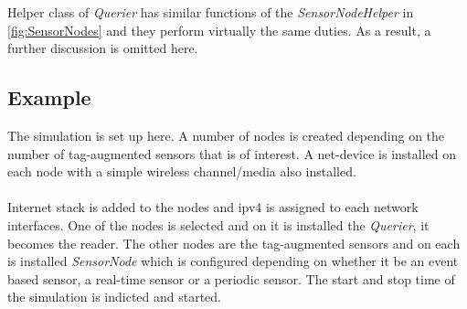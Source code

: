 Helper class of \textit{Querier} has similar functions of the \textit{SensorNodeHelper}
in \ref{fig:SensorNodes} and they perform virtually the same duties. As a result,
a further discussion is omitted here.

\subsection{Example}
The simulation is set up here. A number of nodes is created depending on the number of
tag-augmented sensors that is of interest. A net-device is installed on each node with
a simple wireless channel/media also installed.\\\\
Internet stack is added to the nodes and ipv4 is assigned to each network interfaces.
One of the nodes is selected and on it is installed the \textit{Querier}, it becomes
the reader. The other nodes are the tag-augmented sensors and on each is installed
\textit{SensorNode} which is configured depending on whether it be an event based
sensor, a real-time sensor or a periodic sensor. The start and stop time of the
simulation is indicted and started.
